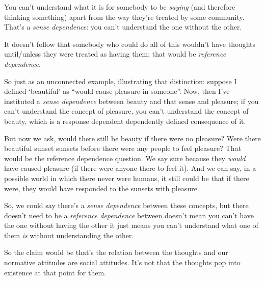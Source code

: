 You can't understand what it is for somebody to be \emph{saying} (and therefore thinking something) apart from the way they're treated by some community. That's a \emph{sense dependence}: you can't understand the one without the other.

It doesn't follow that somebody who could do all of this wouldn't have thoughts until/unless they were treated as having them; that would be \emph{reference dependence}.

So just as an unconnected example, illustrating that distinction: suppose I defined `beautiful' as ``would cause pleasure in someone''. Now, then I've instituted a \emph{sense dependence} between beauty and that sense and pleasure; if you can't understand the concept of pleasure, you can't understand the concept of beauty, which is a response dependent dependently defined consequence of it.

But now we ask, would there still be beauty if there were no pleasure? Were there beautiful sunset sunsets before there were any people to feel pleasure? That would be the reference dependence question. We say sure because they \emph{would} have caused pleasure (if there were anyone there to feel it). And we can say, in a possible world in which there never were humans, it still could be that if there were, they would have responded to the sunsets with pleasure.

So, we could say there's a \emph{sense dependence} between these concepts, but there doesn't need to be a \emph{reference dependence} between doesn't mean you can't have the one without having the other it just means you can't understand what one of them \emph{is} without understanding the other.

So the claim would be that's the relation between the thoughts and our normative attitudes are social attitudes. It's not that the thoughts pop into existence at that point for them.